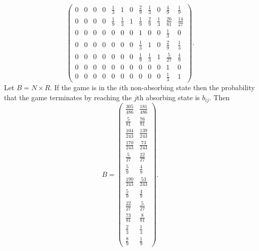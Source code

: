 \documentclass[12pt]{article}
\begin{document}
\begin{example}
\[\begin{pmatrix}
            0   & 0     & 0     & 0     & \frac{1}{3}   & 1     & 0
            & \frac{2}{9}       & \frac{1}{3}   & 0     & \frac{4}{9}
            & \frac{1}{9}\\
            0   & 0     & 0     & 0     & \frac{1}{9}   & \frac{1}{3}
            & 1 & \frac{1}{9}   & \frac{2}{9}   & \frac{1}{3}   & \frac{26}
            {81}        & \frac{14}{27}\\
            0   & 0     & 0     & 0     & 0     & 0     & 0     & 1
            & 0 & 0     & \frac{1}{3}   & 0\\
            0   & 0     & 0     & 0     & 0     & 0     & 0     & \frac{1}
            {3} & 1     & 0     & \frac{2}{9}   & \frac{1}{3}\\
            0   & 0     & 0     & 0     & 0     & 0     & 0     & \frac{1}
            {9} & \frac{1}{3}   & 1     & \frac{5}{27}  & \frac{4}{9}\\
            0   & 0     & 0     & 0     & 0     & 0     & 0     & 0
            & 0 & 0     & 1     & 0\\
            0   & 0     & 0     & 0     & 0     & 0     & 0     & 0
            & 0 & 0     & \frac{1}{3}   & 1
        \end{pmatrix}
        .
    \]%
    Let \( B = N \times R \).  If the game is in the \( i \)th
    non-absorbing state then the probability that the game terminates by
    reaching the \( j \)th absorbing state is \( b_{ij} \).  Then
    \[
        B =
        \begin{pmatrix}
            \frac{305}{486}     & \frac{181}{486}\\
            \frac{5}{81}        & \frac{76}{81}\\
            \frac{104}{243}     & \frac{139}{243}\\
            \frac{170}{243}     & \frac{73}{243}\\
            \frac{5}{27}        & \frac{22}{27}\\
            \frac{5}{9} & \frac{4}{9}\\
            \frac{190}{243}     & \frac{53}{243}\\
            \frac{5}{9} & \frac{4}{9}\\
            \frac{22}{27}       & \frac{5}{27}\\
            \frac{73}{81}       & \frac{8}{81}\\
            \frac{2}{3} & \frac{1}{3}\\
            \frac{8}{9} & \frac{1}{9}
        \end{pmatrix}
        .
    \]
\end{example}
\end{document}

